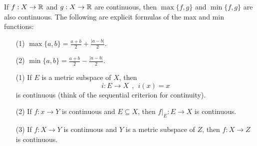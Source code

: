 \documentclass[a4paper]{article}
\begin{document}
\begin{eg}
    If \( f: X \to \mathbb{R}  \) and \( g: X \to \mathbb{R} \) are continuous, then \( \max \{ f,g \}  \) and \( \min \{ f,g \}  \) are also continuous. The following are explicit formulas of the max and min functions: 
    \begin{enumerate}
        \item[(1)] \( \max \{ a,b \}  = \frac{ a+ b }{ 2  }  + \frac{ | a - b |  }{ 2  }  \).
        \item[(2)] \( \min \{ a,b \}  = \frac{ a + b  }{  2  }  - \frac{ | a- b |  }{ 2 }  \).
    \end{enumerate}
\end{eg}

\begin{eg}
    \begin{enumerate}
        \item[(1)] If \( E  \) is a metric subspace of \( X  \), then
            \[  i : E \to X   \ \ , \ \ i(x) = x \]
            is continuous (think of the sequential criterion for continuity).
        \item[(2)] If \( f: x \to Y \) is continuous and \( E \subseteq  X  \), then \( f |_{E} : E \to X  \) is continuous.
        \item[(3)] If \( f: X \to Y \) is continuous and \( Y  \) is a metric subspace of \( Z  \), then \( f: X \to Z \) is continuous.
    \end{enumerate} 
\end{eg}
\end{document}
